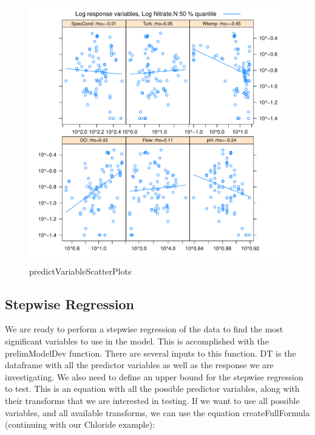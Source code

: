 \documentclass[a4paper,11pt]{article}\usepackage[]{graphicx}\usepackage[]{color}
\makeatletter
\def\maxwidth{ %
  \ifdim\Gin@nat@width>\linewidth
    \linewidth
  \else
    \Gin@nat@width
  \fi
}
\newenvironment{knitrout}{}{} %
\makeatother
\begin{document}
\begin{knitrout}
\begin{figure}[]
\includegraphics[width=\maxwidth]{figure/predictVariableScatterPlots2} \caption[predictVariableScatterPlots]{predictVariableScatterPlots\label{fig:predictVariableScatterPlots2}}
\end{figure}


\end{knitrout}


\FloatBarrier
\subsection{Stepwise Regression}
We are ready to perform a stepwise regression of the data to find the most significant variables to use in the model. This is accomplished with the prelimModelDev function. There are several inputs to this function. DT is the dataframe with all the predictor variables as well as the response we are investigating. We also need to define an upper bound for the stepwise regression to test. This is an equation with all the possible predictor variables, along with their transforms that we are interested in testing. If we want to use all possible variables, and all available transforms, we can use the equation createFullFormula (continuing with our Chloride example):
\end{document}
